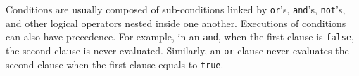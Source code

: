  Conditions are usually composed of sub-conditions linked by {\tt or}'s, {\tt and}'s, {\tt not}'s, and other logical operators nested inside one another.
Executions of conditions can also have precedence.  For example, in an {\tt and}, when the first clause is {\tt false}, the second clause is never evaluated.  Similarly, an {\tt or} clause never evaluates the second clause when the first clause equals to {\tt true}.


	


